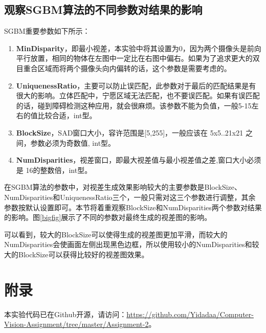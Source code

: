 \documentclass[]{article}
\begin{document}
    \subsection{观察SGBM算法的不同参数对结果的影响}
    SGBM重要参数如下所示：
    \begin{enumerate}
        \item \textbf{MinDisparity}，即最小视差，本实验中将其设置为0，因为两个摄像头是前向平行放置，相同的物体在左图中一定比在右图中偏右。如果为了追求更大的双目重合区域而将两个摄像头向内偏转的话，这个参数是需要考虑的。 

        \item \textbf{UniquenessRatio}，主要可以防止误匹配，此参数对于最后的匹配结果是有很大的影响。立体匹配中，宁愿区域无法匹配，也不要误匹配。如果有误匹配的话，碰到障碍检测这种应用，就会很麻烦。该参数不能为负值，一般5-15左右的值比较合适，int型。

        \item \textbf{BlockSize}，SAD窗口大小，容许范围是[5,255]，一般应该在 5x5..21x21 之间，参数必须为奇数值, int型。 

        \item \textbf{NumDisparities}，视差窗口，即最大视差值与最小视差值之差,窗口大小必须是 16的整数倍，int型。
    \end{enumerate}

    在SGBM算法的参数中，对视差生成效果影响较大的主要参数是BlockSize、NumDisparities和UniquenessRatio三个，一般只需对这三个参数进行调整，其余参数按默认设置即可。本节将着重观察BlockSize和NumDisparities两个参数对结果的影响。图\ref{bigfig}展示了不同的参数对最终生成的视差图的影响。

    可以看到，较大的BlockSize可以使得生成的视差图更加平滑，而较大的NumDisparities会使画面左侧出现黑色边框，所以使用较小的NumDisparities和较大的BlockSize可以获得比较好的视差图效果。
    

    \newpage
    \section{附录}
    本实验代码已在Github开源，请访问：\url{https://github.com/Yidadaa/Computer-Vision-Assignment/tree/master/Assignment-2}。
    

    
\end{document}
